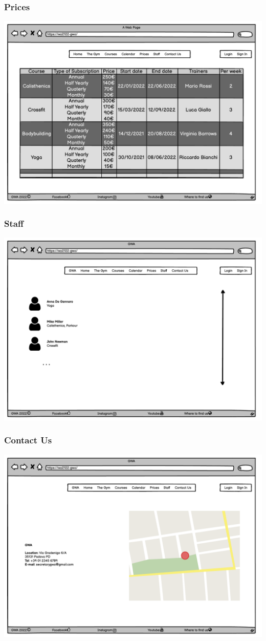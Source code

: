 \subsubsection{Prices}
\includegraphics[width=0.8\columnwidth]{InterfaceMockup/Prices/prices_page.pdf}

\subsubsection{Staff}
\includegraphics[width=0.8\columnwidth]{InterfaceMockup/staff.pdf}

\subsubsection{Contact Us}
\includegraphics[width=0.8\columnwidth]{InterfaceMockup/contact_us.pdf}

